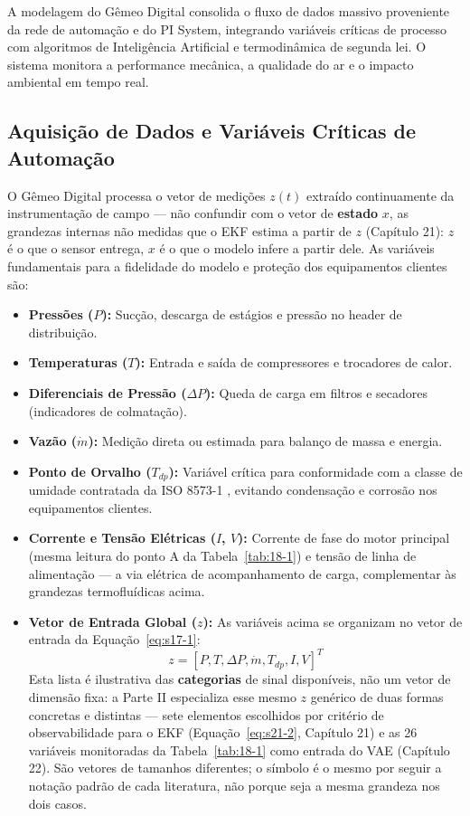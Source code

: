 \documentclass[12pt,a4paper]{article}
\numberwithin{equation}{section}
\numberwithin{table}{section}
\numberwithin{figure}{section}
\begin{document}
{A modelagem do Gêmeo Digital consolida o fluxo de dados massivo proveniente da rede de automação e do PI System, integrando variáveis críticas de processo com algoritmos de Inteligência Artificial e termodinâmica de segunda lei. O sistema monitora a performance mecânica, a qualidade do ar e o impacto ambiental em tempo real.

\subsection{Aquisição de Dados e Variáveis Críticas de Automação}

O Gêmeo Digital processa o vetor de medições $z(t)$ extraído continuamente da instrumentação de campo — não confundir com o vetor de \textbf{estado} $x$, as grandezas internas não medidas que o EKF estima a partir de $z$ (Capítulo 21): $z$ é o que o sensor entrega, $x$ é o que o modelo infere a partir dele. As variáveis fundamentais para a fidelidade do modelo e proteção dos equipamentos clientes são:

\begin{itemize}
	\item \textbf{Pressões ($P$):} Sucção, descarga de estágios e pressão no header de distribuição.
	\item \textbf{Temperaturas ($T$):} Entrada e saída de compressores e trocadores de calor.
	\item \textbf{Diferenciais de Pressão ($\Delta P$):} Queda de carga em filtros e secadores (indicadores de colmatação).
	\item \textbf{Vazão ($\dot{m}$):} Medição direta ou estimada para balanço de massa e energia.
	\item \textbf{Ponto de Orvalho ($T_{dp}$):} Variável crítica para conformidade com a classe de umidade contratada da ISO 8573-1 \cite{iso8573}, evitando condensação e corrosão nos equipamentos clientes.
	\item \textbf{Corrente e Tensão Elétricas ($I$, $V$):} Corrente de fase do motor principal (mesma leitura do ponto A da Tabela~\ref{tab:18-1}) e tensão de linha de alimentação — a via elétrica de acompanhamento de carga, complementar às grandezas termofluídicas acima.
	\item \textbf{Vetor de Entrada Global ($z$):} As variáveis acima se organizam no vetor de entrada da Equação~\eqref{eq:s17-1}:
	\begin{equation}\label{eq:s17-1}
z = [P, T, \Delta P, \dot{m}, T_{dp}, I, V]^T
\end{equation}
	Esta lista é ilustrativa das \textbf{categorias} de sinal disponíveis, não um vetor de dimensão fixa: a Parte II especializa esse mesmo $z$ genérico de duas formas concretas e distintas — sete elementos escolhidos por critério de observabilidade para o EKF (Equação~\eqref{eq:s21-2}, Capítulo 21) e as 26 variáveis monitoradas da Tabela~\ref{tab:18-1} como entrada do VAE (Capítulo 22). São vetores de tamanhos diferentes; o símbolo é o mesmo por seguir a notação padrão de cada literatura, não porque seja a mesma grandeza nos dois casos.
\end{itemize}

}
\end{document}
